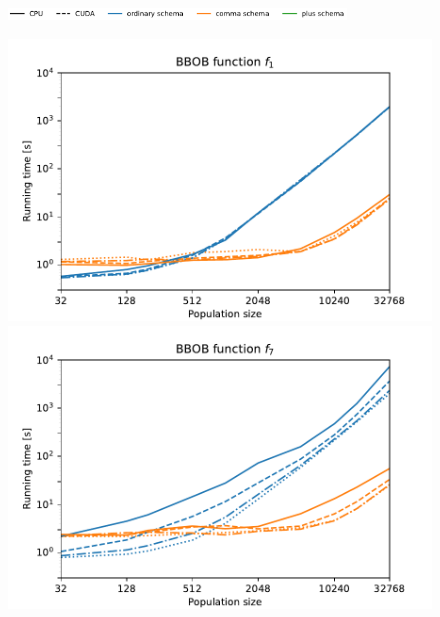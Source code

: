 \begin{figure}[ht!]
\begin{minipage}[t]{0.32\textwidth}
    \end{minipage}

    \begin{minipage}{\textwidth}
        \centering
        \includegraphics[width=0.8\textwidth]{img/runs/time_es_schema_legend.pdf}
    \end{minipage}

    \caption[Running times crossover schemas]{}
\end{figure}




\begin{figure}[ht!]
    \begin{minipage}[t]{0.32\textwidth}
        \centering
        \includegraphics[width=\textwidth]{img/runs/time_pso2006_fn1_alldim.pdf}
    \end{minipage}
    \hfill
    \begin{minipage}[t]{0.32\textwidth}
        \centering
        \includegraphics[width=\textwidth]{img/runs/time_pso2006_fn7_alldim.pdf}

\end{minipage}
\end{figure}
